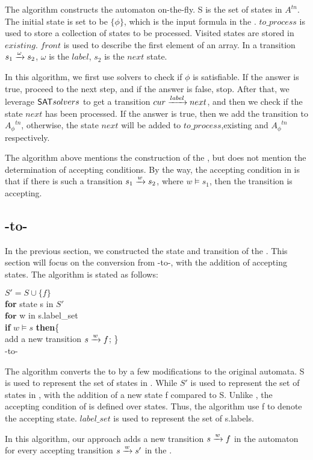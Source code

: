 The algorithm constructs the automaton on-the-fly. S is the set of states in \TNFA $A^{tn}$. The initial state is set to be $\{\phi\}$, which is the input formula in the \XNF. $to\_process$ is used to store a collection of states to be processed. Visited states are stored in $existing$. $front$ is used to describe the first element of an array. In a transition $s_1\xrightarrow[]{\omega}s_2$, $\omega$ is the $label$, $s_2$ is the $next$ state. 


In this algorithm, we first use \SAT solvers to check if $\phi$ is satisfiable. If the answer is true, proceed to the next step, and if the answer is false, stop. After that, we leverage ${\sf SAT} solvers$ to get a transition $cur\xrightarrow[]{label}next$, and then we check if the state $next$ has been processed. If the answer is true, then we add the transition to ${A_{\phi}}^{tn}$, otherwise, the state $next$ will be added to  $to\_process$,existing and ${A_{\phi}}^{tn}$ respectively. 


The algorithm above mentions the construction of the \TNFA, but does not mention the determination of accepting conditions. By the way, the accepting condition in \TNFA is that if there is such a transition $s_1\xrightarrow[]{w}s_2$, where $w\models s_1$, then the transition is accepting.  


\subsection{\TNFA-to-\NFA}  
In the previous section, we constructed the state and transition of the \TNFA. This section will focus on the conversion from \TNFA-to-\NFA, with the addition of accepting states. The algorithm is stated as follows:\\

\IncMargin{1em}
 \begin{algorithm}[H]
    \SetAlgoNoLine
    \BlankLine
$S' = S\cup \{f\}$\\
\textbf{for} state s in $S'$ \\
\qquad  $ \textbf{for}$ w in s.label\_set  \\
\qquad  \quad \textbf{if} $w \models s$   \textbf{then}\{      \\
\qquad \qquad add a new transition $s\xrightarrow[]{w}f$;    \}     \\
 \caption{\TNFA-to-\NFA}
\end{algorithm}
The algorithm converts the \TNFA to \NFA by a few modifications to the original automata. S is used to represent the set of states in \TNFA. While $S'$ is used to represent the set of states in \NFA, with the addition of a new state f compared to S. Unlike \TNFA, the accepting condition of \NFA is defined over states. Thus, the algorithm use f to denote the accepting state. $label\_set$ is used to represent the set of s.labels. 

In this algorithm, our approach adds a new transition $s\xrightarrow[]{w}f$ in the automaton for every accepting transition $s\xrightarrow[]{w}s'$ in the \TNFA. 
